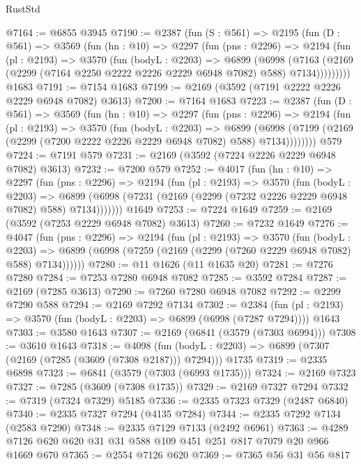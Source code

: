 \begin{lexlean}{RustStd}
\begin{coremodule}
{\begin{coremodule}
{{{{{{{{{{{{{{{@7164 := @6855 @3945
@7190 := @2387
    (fun (S : @561) =>
    @2195
      (fun (D : @561) =>
      @3569
        (fun (hn : @10) =>
        @2297
          (fun (pns : @2296) =>
          @2194
            (fun (pl : @2193) =>
            @3570
              (fun (bodyL : @2203) =>
              @6899
                (@6998
                  (@7163
                    (@2169 (@2299 (@7164 @2250 @2222 @2226 @2229 @6948 @7082) @588) @7134)))))))))
    @1683
@7191 := @7154 @1683
@7199 := @2169 (@3592 (@7191 @2222 @2226 @2229 @6948 @7082) @3613)
@7200 := @7164 @1683
@7223 := @2387
    (fun (D : @561) =>
    @3569
      (fun (hn : @10) =>
      @2297
        (fun (pns : @2296) =>
        @2194
          (fun (pl : @2193) =>
          @3570
            (fun (bodyL : @2203) =>
            @6899
              (@6998 (@7199 (@2169 (@2299 (@7200 @2222 @2226 @2229 @6948 @7082) @588) @7134))))))))
    @579
@7224 := @7191 @579
@7231 := @2169 (@3592 (@7224 @2226 @2229 @6948 @7082) @3613)
@7232 := @7200 @579
@7252 := @4017
    (fun (hn : @10) =>
    @2297
      (fun (pns : @2296) =>
      @2194
        (fun (pl : @2193) =>
        @3570
          (fun (bodyL : @2203) =>
          @6899 (@6998 (@7231 (@2169 (@2299 (@7232 @2226 @2229 @6948 @7082) @588) @7134)))))))
    @1649
@7253 := @7224 @1649
@7259 := @2169 (@3592 (@7253 @2229 @6948 @7082) @3613)
@7260 := @7232 @1649
@7276 := @4047
    (fun (pns : @2296) =>
    @2194
      (fun (pl : @2193) =>
      @3570
        (fun (bodyL : @2203) =>
        @6899 (@6998 (@7259 (@2169 (@2299 (@7260 @2229 @6948 @7082) @588) @7134))))))
@7280 := @11 @1626 (@11 @1635 @20)
@7281 := @7276 @7280
@7284 := @7253 @7280 @6948 @7082
@7285 := @3592 @7284
@7287 := @2169 (@7285 @3613)
@7290 := @7260 @7280 @6948 @7082
@7292 := @2299 @7290 @588
@7294 := @2169 @7292 @7134
@7302 := @2384
    (fun (pl : @2193) => @3570 (fun (bodyL : @2203) => @6899 (@6998 (@7287 @7294))))
    @1643
@7303 := @3580 @1643
@7307 := @2169 (@6841 (@3579 (@7303 @6994)))
@7308 := @3610 @1643
@7318 := @4098
    (fun (bodyL : @2203) => @6899 (@7307 (@2169 (@7285 (@3609 (@7308 @2187))) @7294)))
    @1735
@7319 := @2335 @6898
@7323 := @6841 (@3579 (@7303 (@6993 @1735)))
@7324 := @2169 @7323
@7327 := @7285 (@3609 (@7308 @1735))
@7329 := @2169 @7327 @7294
@7332 := @7319 (@7324 @7329) @5185
@7336 := @2335 @7323 @7329 (@2487 @6840)
@7340 := @2335 @7327 @7294 (@4135 @7284)
@7344 := @2335 @7292 @7134 (@2583 @7290)
@7348 := @2335 @7129 @7133 (@2492 @6961)
@7363 := @4289 @7126 @620 @620 @31 @31 @588 @109 @451 @251 @817 @7079 @20 @966 @1669 @670
@7365 := @2554 @7126 @620
@7369 := @7365 @56 @31 @56 @817
}}}}}}}}}}}}}}}
\end{coremodule}}
\end{coremodule}
\end{lexlean}
